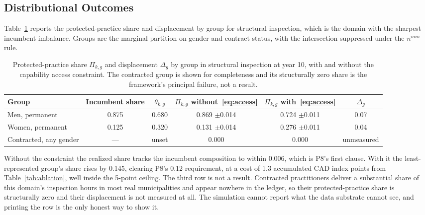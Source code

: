 	\FloatBarrier
	
	\subsection{Distributional Outcomes}
	\label{sec:distresults}
	
	Table~\ref{tab:dist} reports the protected-practice share and displacement by group for structural inspection, which is the domain with the sharpest incumbent imbalance. Groups are the marginal partition on gender and contract status, with the intersection suppressed under the $n^{min}$ rule.
	
	\begin{table}[!htbp]
		\caption{Protected-practice share $\Pi_{k,g}$ and displacement $\Delta_g$ by group in structural inspection at year 10, with and without the capability access constraint. The contracted group is shown for completeness and its structurally zero share is the framework's principal failure, not a result.}
		\label{tab:dist}
		\footnotesize
		\setlength{\tabcolsep}{3pt}
		\begin{tabularx}{\textwidth}{@{}Xccccc@{}}
			\toprule
			\textbf{Group} & \textbf{Incumbent share} & \textbf{$\theta_{k,g}$} & \textbf{$\Pi_{k,g}$ without~\eqref{eq:access}} & \textbf{$\Pi_{k,g}$ with~\eqref{eq:access}} & \textbf{$\Delta_g$}\\
			\midrule
			Men, permanent & 0.875 & 0.680 & 0.869 {\scriptsize$\pm$0.014} & 0.724 {\scriptsize$\pm$0.011} & 0.07\\
			Women, permanent & 0.125 & 0.320 & 0.131 {\scriptsize$\pm$0.014} & 0.276 {\scriptsize$\pm$0.011} & 0.04\\
			Contracted, any gender & --- & unset & 0.000 & 0.000 & unmeasured\\
			\bottomrule
		\end{tabularx}
	\end{table}
	
	Without the constraint the realized share tracks the incumbent composition to within 0.006, which is P8's first clause. With it the least-represented group's share rises by 0.145, clearing P8's 0.12 requirement, at a cost of 1.3 accumulated CAD index points from Table~\ref{tab:ablation}, well inside the 5-point ceiling. The third row is not a result. Contracted practitioners deliver a substantial share of this domain's inspection hours in most real municipalities and appear nowhere in the ledger, so their protected-practice share is structurally zero and their displacement is not measured at all. The simulation cannot report what the data substrate cannot see, and printing the row is the only honest way to show it.
	
